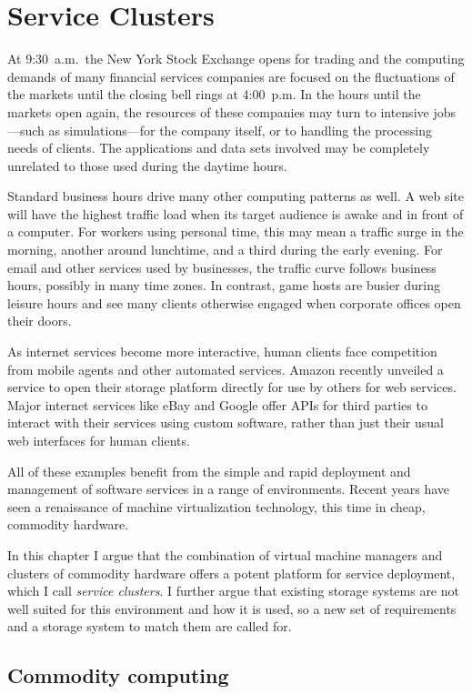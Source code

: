 \chapter{Service Clusters}

At 9:30~a.m.\ the New York Stock Exchange opens for trading and the computing demands of many financial services companies are focused on the fluctuations of the markets until the closing bell rings at 4:00~p.m. In the hours until the markets open again, the resources of these companies may turn to intensive jobs---such as simulations---for the company itself, or to handling the processing needs of clients. The applications and data sets involved may be completely unrelated to those used during the daytime hours.

Standard business hours drive many other computing patterns as well. A web site will have the highest traffic load when its target audience is awake and in front of a computer. For workers using personal time, this may mean a traffic surge in the morning, another around lunchtime, and a third during the early evening. For email and other services used by businesses, the traffic curve follows business hours, possibly in many time zones. In contrast, game hosts are busier during leisure hours and see many clients otherwise engaged when corporate offices open their doors.

As internet services become more interactive, human clients face competition from mobile agents and other automated services. Amazon recently unveiled a service to open their storage platform directly for use by others for web services. Major internet services like eBay and Google offer APIs for third parties to interact with their services using custom software, rather than just their usual web interfaces for human clients.

All of these examples benefit from the simple and rapid deployment and management of software services in a range of environments. Recent years have seen a renaissance of machine virtualization technology, this time in cheap, commodity hardware.

In this chapter I argue that the combination of virtual machine managers and clusters of commodity hardware offers a potent platform for service deployment, which I call \textit{service clusters}. I further argue that existing storage systems are not well suited for this environment and how it is used, so a new set of requirements and a storage system to match them are called for.

\section{Commodity computing}
